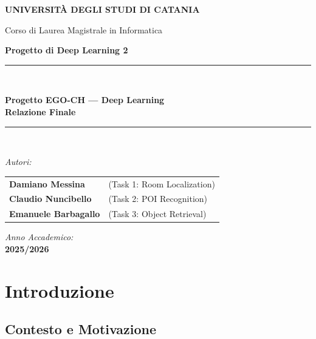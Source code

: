 \documentclass[a4paper,12pt]{report}
\begin{document}
\begin{titlepage}
\centering
{\bfseries \Large UNIVERSITÀ DEGLI STUDI DI CATANIA \par}
\vspace{0.3cm}
{\Large Corso di Laurea Magistrale in Informatica \par}
\vspace{0.2cm}
{\large \textbf{Progetto di Deep Learning 2} \par}
\vspace{1.5cm}
\rule{\linewidth}{0.6pt} \\[0.4cm]
{\huge \bfseries Progetto EGO-CH --- Deep Learning \\[0.3cm] \Large Relazione Finale \par}
\rule{\linewidth}{0.6pt} \\[1.5cm]

\begin{minipage}{0.70\textwidth}
\begin{flushleft} \large
\emph{Autori:}\\[0.2cm]
\begin{tabular}{@{} l l @{}}
\textbf{Damiano Messina} & {\small (Task 1: Room Localization)} \\[0.15cm]
\textbf{Claudio Nuncibello} & {\small (Task 2: POI Recognition)} \\[0.15cm]
\textbf{Emanuele Barbagallo} & {\small (Task 3: Object Retrieval)}
\end{tabular}
\end{flushleft}
\end{minipage}%
\hfill
\begin{minipage}{0.28\textwidth}
\begin{flushright} \large
\emph{Anno Accademico:}\\
\textbf{2025/2026}
\end{flushright}
\end{minipage}

\vfill
\end{titlepage}

\tableofcontents
\newpage

\chapter{Introduzione}

\section{Contesto e Motivazione}
\end{document}
